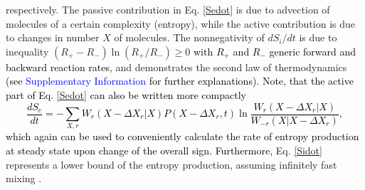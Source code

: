 \documentclass[aps,prl,reprint,singlecolumn,superscriptaddress]{revtex4}
\begin{document}
respectively. The passive contribution in Eq. \ref{Sedot} is due to advection of molecules of a certain complexity (entropy), while the
active contribution is due to changes in number $X$ of molecules.
The nonnegativity of $dS_i/dt$ is due to inequality $(R_+-R_-)\ln(R_+/R_-)\geq 0$ \textcolor{black}{with $R_+$ and $R_-$ generic forward and backward
reaction rates}, and demonstrates the second law of thermodynamics 
\textcolor{black}{(see \textcolor{blue}{Supplementary Information} for further explanations). Note, that the active part of 
Eq. \ref{Sedot} can also be written more compactly \cite{lebowitz99}
\begin{equation}
\frac{dS_e}{dt}=-\sum_{X,r}W_{r}(X-\Delta X_r|X) P(X-\Delta X_r,t)\ln\frac{W_{r}(X-\Delta X_r|X)}{W_{-r}(X|X-\Delta X_r)},\label{Sedot2}
\end{equation}
which again can be used to conveniently calculate the rate of entropy production at steady state upon change of the overall sign.
Furthermore,} Eq. \ref{Sidot} represents a lower bound of the entropy production, assuming infinitely fast mixing \cite{esposito12,ziener15}.
\end{document}
